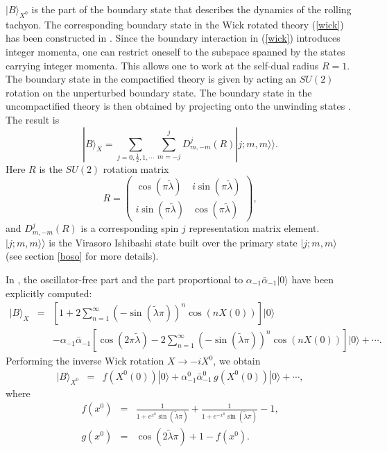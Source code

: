\documentclass[a4paper,12pt]{article} \textheight=8.5truein
\begin{document}
$|B\rangle_{X^0}$ is the part of the boundary state that describes
the dynamics of the rolling tachyon. The corresponding boundary
state in the Wick rotated theory (\ref{wick}) has been constructed
in \cite{Callan:1994ub,Polchinski:my,Recknagel}. Since the boundary
interaction in (\ref{wick}) introduces integer momenta, one can
restrict oneself to the subspace spanned by the states carrying
integer momenta. This allows one to work at the self-dual radius
$R=1$. The boundary state in the compactified theory is given by
acting an $SU(2)$ rotation on the unperturbed boundary state. The
boundary state in the uncompactified theory is then obtained by
projecting onto the unwinding states \cite{Callan:1994ub,Recknagel}.
The result is
\begin{equation}
  |B\rangle_{X} =
\sum_{j=0,\frac{1}{2},1,\cdots}\sum_{m=-j}^{j}D^j_{m,-m}(R)
|j;m,m\rangle\rangle.
\label{bdrystate}
\end{equation}
Here $R$ is the $SU(2)$ rotation matrix
\begin{equation}\label{R matrix}
R=  \left(
    \begin{array}{ll}
\cos(\pi\tilde{\lambda}) & i\sin(\pi\tilde{\lambda})\\
i\sin(\pi\tilde{\lambda}) &\cos(\pi\tilde{\lambda})
    \end{array}
\right),
\end{equation}
and $D^j_{m,-m}(R)$ is a corresponding spin $j$ representation
matrix element. $|j;m,m\rangle\rangle$ is the Virasoro Ishibashi
state built over the primary state $|j;m,m\rangle$ (see section
\ref{boso} for more details).


In \cite{Sen:2002nu}, the oscillator-free part and the part
proportional to $\alpha_{-1}\bar{\alpha}_{-1}|0\rangle$ have been
 explicitly computed:
\begin{eqnarray}
  |B\rangle_X&=&
\left[ 1+2\sum_{n=1}^{\infty}(-\sin(\tilde{\lambda}\pi))^n \cos(nX(0))
\right]|0\rangle\nonumber\\
&&-\alpha_{-1}\bar{\alpha}_{-1} \left[ \cos(2\pi\tilde{\lambda})
-2\sum_{n=1}^{\infty}(-\sin(\tilde{\lambda}\pi))^n \cos(n X(0))
\right]|0\rangle +\cdots.
\label{SenBX}
\end{eqnarray}
Performing the inverse Wick rotation $X\rightarrow -iX^0$, we
obtain \cite{Sen:2002nu}
\begin{eqnarray}
|B\rangle_{X^0}&=& f(X^0(0))|0\rangle +
\alpha^0_{-1}\bar{\alpha}^0_{-1}\, g(X^0(0))|0\rangle +\cdots,
\label{SenBX0}
\end{eqnarray}
where
\begin{eqnarray}
f(x^0)&=&\frac{1}{1+e^{x^0}\sin(\tilde\lambda\pi)}
+\frac{1}{1+e^{-x^0}\sin(\tilde\lambda\pi)}-1,
\label{f(x)}\\
g(x^0)&=&\cos(2\tilde\lambda\pi)+1-f(x^0).
\end{eqnarray}
\end{document}
